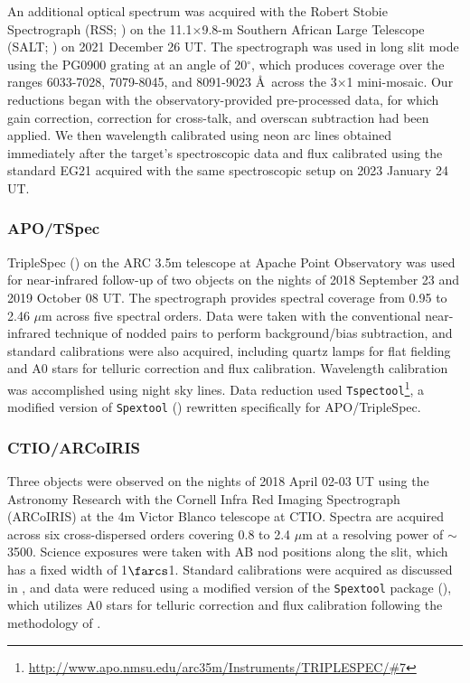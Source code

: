 \documentclass[twocolumn,tighten,twocolappendix]{aastex631}
\begin{document}
An additional optical spectrum was acquired with the Robert Stobie Spectrograph (RSS; \citealt{burgh2003,kobulnicky2003}) on the 11.1$\times$9.8-m Southern African Large Telescope (SALT; \citealt{buckley2006}) on 2021 December 26 UT. The spectrograph was used in long slit mode using the PG0900 grating at an angle of 20$^\circ$, which produces coverage over the ranges 6033-7028, 7079-8045, and 8091-9023 \AA\ across the 3$\times$1 mini-mosaic. Our reductions began with the observatory-provided pre-processed data, for which gain correction, correction for cross-talk, and overscan subtraction had been applied. We then wavelength calibrated using neon arc lines obtained immediately after the target's spectroscopic data and flux calibrated using the \cite{hamuy1994} standard EG21 acquired with the same spectroscopic setup on 2023 January 24 UT.

\subsubsection{APO/TSpec}

TripleSpec (\citealt{wilson2004}) on the ARC 3.5m telescope at Apache Point Observatory was used for near-infrared follow-up of two objects on the nights of 2018 September 23 and 2019 October 08 UT. The spectrograph provides spectral coverage from 0.95 to 2.46 $\mu$m across five spectral orders. Data were taken with the conventional near-infrared technique of nodded pairs to perform background/bias subtraction, and standard calibrations were also acquired, including quartz lamps for flat fielding and A0 stars for telluric correction and flux calibration. Wavelength calibration was accomplished using night sky lines. Data reduction used \texttt{Tspectool}\footnote{\url{http://www.apo.nmsu.edu/arc35m/Instruments/TRIPLESPEC/\#7}}, a modified version of \texttt{Spextool} (\citealt{cushing2004}) rewritten specifically for APO/TripleSpec. 

\subsubsection{CTIO/ARCoIRIS}

Three objects were observed on the nights of 2018 April 02-03 UT using the Astronomy Research with the Cornell Infra Red Imaging Spectrograph (ARCoIRIS) at the 4m Victor Blanco telescope at CTIO. Spectra are acquired across six cross-dispersed orders covering 0.8 to 2.4 $\mu$m at a resolving power of $\sim$3500. Science exposures were taken with AB nod positions along the slit, which has a fixed width of 1$\farcs$1. Standard calibrations were acquired as discussed in \cite{greco2019}, and data were reduced using a modified version of the \texttt{Spextool} package (\citealt{cushing2004}), which utilizes A0 stars for telluric correction and flux calibration following the methodology of \cite{vacca2003}.
\end{document}
